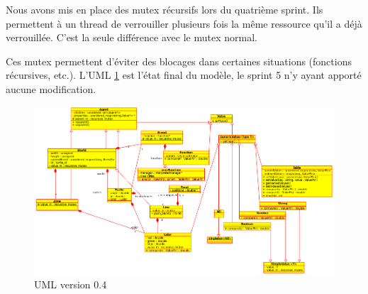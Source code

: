 Nous avons mis en place des mutex récursifs lors du quatrième sprint. Ils permettent à un thread de verrouiller plusieurs fois la même ressource qu'il a déjà verrouillée. C'est la seule différence avec le mutex normal. 

Ces mutex permettent d'éviter des blocages dans certaines situations (fonctions récursives, etc.).
L'UML \ref{v0.4} est l'état final du modèle, le sprint 5 n'y ayant apporté aucune modification.
\begin{figure}[h]
\centering
\includegraphics[scale=0.55, angle=90]{doc/report/uml/v04.png}
\caption{\label{v0.4} UML version 0.4}
\end{figure}

